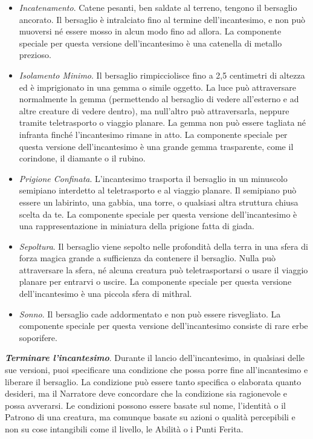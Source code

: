 \begin{multicols}{2}
\begin{itemize}[leftmargin=*] \setlength{\itemsep}{0pt}
	\item \emph{Incatenamento}. Catene pesanti, ben saldate al terreno, tengono il bersaglio ancorato. Il bersaglio è intralciato fino al termine dell'incantesimo, e non può muoversi né essere mosso in alcun modo fino ad allora. La componente speciale per questa versione dell'incantesimo è una catenella di metallo prezioso.
	\item \emph{Isolamento Minimo}. Il bersaglio rimpicciolisce fino a 2,5 centimetri di altezza ed è imprigionato in una gemma o simile oggetto. La luce può attraversare normalmente la gemma (permettendo al bersaglio di vedere all'esterno e ad altre creature di vedere dentro), ma null'altro può attraversarla, neppure tramite teletrasporto o viaggio planare. La gemma non può essere tagliata né infranta finché l'incantesimo rimane in atto. La componente speciale per questa versione dell'incantesimo è una grande gemma trasparente, come il corindone, il diamante o il rubino.
	\item \emph{Prigione Confinata}. L'incantesimo trasporta il bersaglio in un minuscolo semipiano interdetto al teletrasporto e al viaggio planare. Il semipiano può essere un labirinto, una gabbia, una torre, o qualsiasi altra struttura chiusa scelta da te. La componente speciale per questa versione dell'incantesimo è una rappresentazione in miniatura della prigione fatta di giada.
	\item \emph{Sepoltura}. Il bersaglio viene sepolto nelle profondità della terra in una sfera di forza magica grande a sufficienza da contenere il bersaglio. Nulla può attraversare la sfera, né alcuna creatura può teletrasportarsi o usare il viaggio planare per entrarvi o uscire. La componente speciale per questa versione dell'incantesimo è una piccola sfera di mithral.
	\item \emph{Sonno}. Il bersaglio cade addormentato e non può essere risvegliato. La componente speciale per questa versione dell'incantesimo consiste di rare erbe soporifere.
\end{itemize}

\emph{\textbf{Terminare l'incantesimo}}. Durante il lancio dell'incantesimo, in qualsiasi delle sue versioni, puoi specificare una condizione che possa porre fine all'incantesimo e liberare il bersaglio. La condizione può essere tanto specifica o elaborata quanto desideri, ma il Narratore deve concordare che la condizione sia ragionevole e possa avverarsi. Le condizioni possono essere basate sul nome, l'identità o il Patrono di una creatura, ma comunque basate su azioni o qualità percepibili e non su cose intangibili come il livello, le Abilità o i Punti Ferita.


\end{multicols}
